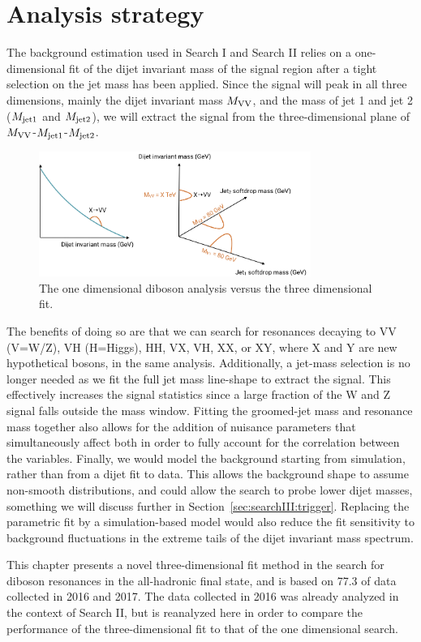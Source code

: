 \section{Analysis strategy}
The background estimation used in Search I and Search II relies on a one-dimensional fit of the dijet invariant mass of the signal region after a tight selection on the jet mass has been applied. Since the signal will peak in all three dimensions, mainly the dijet invariant mass $M_{\rm VV}$, and the mass of jet 1 and jet 2 ($M_{\rm jet1}$ and $M_{\rm jet2}$), we will extract the signal from the three-dimensional plane of $M_{\rm VV}$-$M_{\rm jet1}$-$M_{\rm jet2}$.
\begin{figure}[h!] 
    \centering
    \includegraphics[width=0.79\textwidth]{figures/analysis/search3/misc/1Dvs3D.png}
    \caption{The one dimensional diboson analysis versus the three dimensional fit.}
    \label{fig:searchIII:1Dvs3D}
\end{figure}
The benefits of doing so are that we can search for resonances decaying to VV (V=W/Z), VH (H=Higgs), HH, VX, VH, XX, or XY, where X and Y are new hypothetical bosons, in the same analysis. Additionally, a jet-mass selection is no longer needed as we fit the full jet mass line-shape to extract the signal. This effectively increases the signal statistics since a large fraction of the W and Z signal falls outside the mass window. Fitting the groomed-jet mass and resonance mass together also allows for the addition of nuisance parameters that simultaneously affect both in order to fully account for the correlation between the variables. Finally, we would model the background starting from simulation, rather than from a dijet fit to data. This allows the background shape to assume non-smooth distributions, and could allow the search to probe lower dijet masses, something we will discuss further in Section~\ref{sec:searchIII:trigger}. Replacing the parametric fit by a simulation-based model would also reduce the fit sensitivity to background fluctuations in the extreme tails of the dijet invariant mass spectrum. \par
This chapter presents a novel three-dimensional fit method in the search for diboson resonances in the all-hadronic final state, and is based on 77.3 \fbinv of data collected in 2016 and 2017. The data collected in 2016 was already analyzed in the context of Search II, but is reanalyzed here in order to compare the performance of the three-dimensional fit to that of the one dimensional search.

